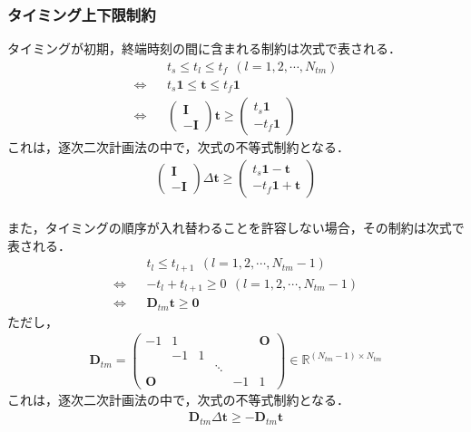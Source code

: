 \subsubsection*{タイミング上下限制約}
タイミングが初期，終端時刻の間に含まれる制約は次式で表される．
\begin{eqnarray}
  &&t_s \leq t_l \leq t_f \ \ (l = 1,2,\cdots,N_{\mathit{tm}}) \\
  \Leftrightarrow&&
  t_s \bm{1} \leq \bm{t} \leq t_f \bm{1} \label{eq:bspline-timing-min-max-constraint} \\
  \Leftrightarrow&&
  \begin{pmatrix} \bm{I} \\ - \bm{I} \end{pmatrix} \bm{t} \geq \begin{pmatrix} t_s \bm{1} \\ - t_f \bm{1} \end{pmatrix}
\end{eqnarray}
これは，逐次二次計画法の中で，次式の不等式制約となる．
\begin{eqnarray}
  \begin{pmatrix} \bm{I} \\ - \bm{I} \end{pmatrix} \Delta \bm{t} \geq \begin{pmatrix} t_s \bm{1} - \bm{t} \\ - t_f \bm{1} + \bm{t} \end{pmatrix} \\
\end{eqnarray}

また，タイミングの順序が入れ替わることを許容しない場合，その制約は次式で表される．
\begin{eqnarray}
  &&t_l \leq t_{l+1} \ \ (l = 1,2,\cdots,N_{\mathit{tm}}-1) \\
  \Leftrightarrow&&
  - t_l + t_{l+1} \geq 0 \ \ (l = 1,2,\cdots,N_{\mathit{tm}}-1) \\
  \Leftrightarrow&&
  \bm{D}_{\mathit{tm}} \bm{t} \geq \bm{0} \label{eq:bspline-timing-order-constraint}
\end{eqnarray}
ただし，
\begin{eqnarray}
  \bm{D}_{\mathit{tm}} = \begin{pmatrix} -1 & 1 &&&& \bm{O} \\ & -1 & 1 &&& \\ &&&\ddots& \\ \bm{O} &&&& -1 & 1 \end{pmatrix} \in \mathbb{R}^{(N_{\mathit{tm}}-1) \times N_{\mathit{tm}}}
\end{eqnarray}
これは，逐次二次計画法の中で，次式の不等式制約となる．
\begin{eqnarray}
  \bm{D}_{\mathit{tm}} \Delta \bm{t} \geq - \bm{D}_{\mathit{tm}} \bm{t}
\end{eqnarray}

